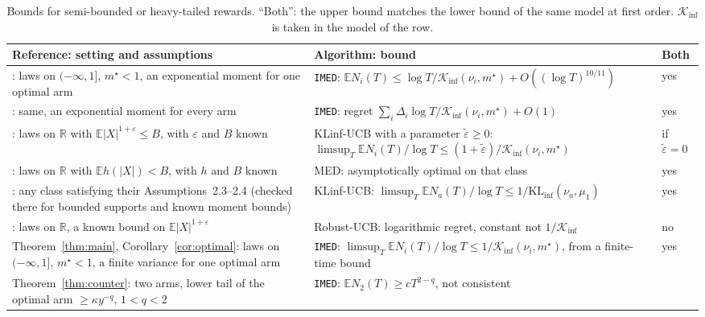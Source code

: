 \documentclass[11pt]{article}
\newcommand{\E}{\mathbb{E}}
\newcommand{\R}{\mathbb{R}}
\begin{document}
\begin{table}[t]
\centering
\caption{Bounds for semi-bounded or heavy-tailed rewards. ``Both'': the upper bound matches the
lower bound of the same model at first order. $\mathcal K_{\inf}$ is taken in the model of the row.}
\label{tab:comparison}
\small
\begin{tabular}{@{}p{}p{}l@{}}
\toprule
Reference: setting and assumptions & Algorithm: bound & Both \\
\midrule
\citet[Thm.~3, Cor.~4]{HT15}: laws on $(-\infty,1]$, $m^\star<1$, an exponential moment for one optimal
arm & \texttt{IMED}: $\E N_i(T)\le\log T/\mathcal K_{\inf}(\nu_i,m^\star)+O((\log T)^{10/11})$ & yes \\
\citet[Thm.~5]{HT15}: same, an exponential moment for every arm & \texttt{IMED}: regret
$\sum_i\Delta_i\log T/\mathcal K_{\inf}(\nu_i,m^\star)+O(1)$ & yes \\
\citet[Cor.~2]{AJK21}: laws on $\R$ with $\E|X|^{1+\varepsilon}\le B$, with $\varepsilon$ and $B$
known & KLinf-UCB with a parameter $\tilde\varepsilon\ge0$:
$\limsup_T\E N_i(T)/\log T\le(1+\tilde\varepsilon)/\mathcal K_{\inf}(\nu_i,m^\star)$ & if $\tilde\varepsilon=0$ \\
\citet[Sec.~4.4]{BSH23}: laws on $\R$ with $\E h(|X|)<B$, with $h$ and $B$ known & MED:
asymptotically optimal on that class & yes \\
\citet[Thm.~3.1]{PA26}: any class satisfying their Assumptions~2.3--2.4 (checked there for bounded
supports and known moment bounds) & KLinf-UCB: $\limsup_T\E N_a(T)/\log T\le1/\mathrm{KL}_{\inf}(\nu_a,\mu_1)$
& yes \\
\citet[Thm.~1]{BCL13}: laws on $\R$, a known bound on $\E|X|^{1+\varepsilon}$ & Robust-UCB:
logarithmic regret, constant not $1/\mathcal K_{\inf}$ & no \\
Theorem~\ref{thm:main}, Corollary~\ref{cor:optimal}: laws on $(-\infty,1]$, $m^\star<1$, a finite
variance for one optimal arm & \texttt{IMED}: $\limsup_T\E N_i(T)/\log T\le1/\mathcal K_{\inf}(\nu_i,m^\star)$, from a
finite-time bound & yes \\
Theorem~\ref{thm:counter}: two arms, lower tail of the optimal arm $\ge\kappa y^{-q}$, $1<q<2$ &
\texttt{IMED}: $\E N_2(T)\ge cT^{2-q}$, not consistent & \\
\bottomrule
\end{tabular}
\end{table}

\end{document}
